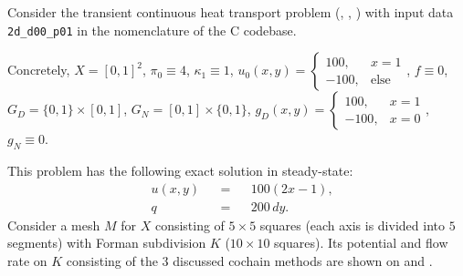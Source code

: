 \begin{example}
  \label{idec/diffusion/continuous/transient/examples/2d_d00_p01-example}
  Consider the transient continuous heat transport problem
  (,
   ,
   )
  with input data \verb|2d_d00_p01| in the nomenclature of the C codebase.

  Concretely,
    $X = [0, 1]^2$,
    $\pi_0 \equiv 4$,
    $\kappa_1 \equiv 1$,
    $u_0(x, y) =
      \begin{cases}
        100, & x = 1 \\
        -100, & \text{else}
      \end{cases}$,
    $f \equiv 0$,
    $G_D = \{0, 1\} \times [0, 1]$,
    $G_N = [0, 1] \times \{0, 1\}$,
    $g_D(x, y) = 
      \begin{cases}
        100, & x = 1 \\
        -100, & x = 0
      \end{cases}$,
    $g_N \equiv 0$.

  This problem has the following exact solution in steady-state:
  \begin{subequations}
    \begin{alignat}{3}
      & u(x, y) && = && 100 (2 x - 1), \\
      & q && = && 200\, d y.
    \end{alignat}
  \end{subequations}
  Consider a mesh $M$ for $X$ consisting of $5 \times 5$ squares (each axis is
  divided into $5$ segments) with Forman subdivision $K$
  ($10 \times 10$ squares).
  Its potential and flow rate on $K$ consisting of the $3$ discussed cochain
  methods are shown on
  and
  .
\end{example}
